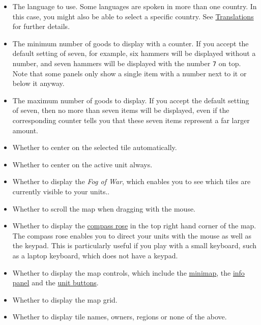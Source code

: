 \documentclass[12pt]{book}
\begin{document}
\begin{itemize}

\item The language to use. Some languages are spoken
  in more than one country. In this case, you might also be able to
  select a specific country. See
  \hyperlink{translations}{Translations} for further details.

\item The minimum number of goods to display with a counter. If you
accept the default setting of seven, for example, six hammers will be
displayed without a number, and seven hammers will be displayed with
the number \verb$7$ on top. Note that some panels only show a single
item with a number next to it or below it anyway.

\item The maximum number of goods to display. If you accept the
default setting of seven, then no more than seven items will be
displayed, even if the corresponding counter tells you that these
seven items represent a far larger amount.

\item Whether to center on the selected tile automatically.

\item Whether to center on the active unit always.

\item Whether to display the \textit{Fog of War}, which enables you to
  see which tiles are currently visible to your units..

\item Whether to scroll the map when dragging with the mouse.

\item Whether to display the \hyperlink{compass rose}{compass rose} in
  the top right hand corner of the map. The compass rose enables you
  to direct your units with the mouse as well as the keypad. This is
  particularly useful if you play with a small keyboard, such as a
  laptop keyboard, which does not have a keypad.

\item Whether to display the map controls, which include the
  \hyperlink{minimap}{minimap}, the \hyperlink{info panel}{info panel}
  and the \hyperlink{unit buttons}{unit buttons}.

\item Whether to display the map grid.

\item Whether to display tile names, owners, regions or none of the
  above.


\end{itemize}
\end{document}
